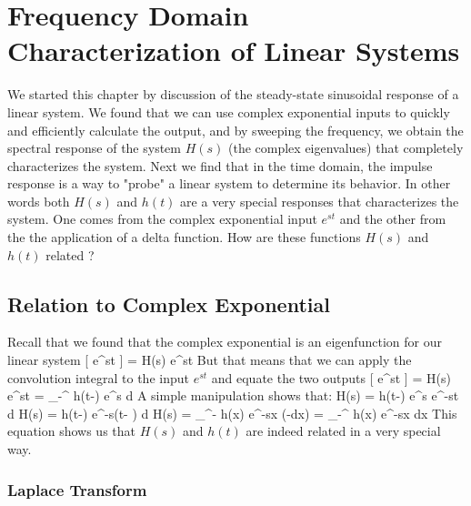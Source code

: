 
\section{Frequency Domain Characterization of Linear Systems}

We started this chapter by discussion of the steady-state sinusoidal response of a linear system.  We found that we can use complex exponential inputs to quickly and efficiently calculate the output, and by sweeping the frequency, we obtain the spectral response of the system $H(s)$ (the complex eigenvalues) that completely characterizes the system.   Next we find that in the time domain, the impulse response is a way to "probe" a linear system to determine its behavior.  In other words both $H(s)$ and $h(t)$ are a very special responses that characterizes the system.  One comes from the complex exponential input $e^{st}$ and the other from the the application of a delta function.  How are these functions $H(s)$ and $h(t)$ related ? 




\subsection{Relation to Complex Exponential}


Recall that we found that the complex exponential is an eigenfunction for our linear system 
\be
	 [ e^{st} ] = H(s) e^{st} 
\ee
But that means that we can apply the convolution integral to the input $e^{st}$ and equate the two outputs
\be
	 [ e^{st} ] = H(s) e^{st}  = \int_{-\infty}^{\infty} h(t-\tau) e^{s\tau} d\tau
\ee
A simple manipulation shows that:
\be
	H(s) = \int h(t-\tau) e^{s\tau} e^{-st} d\tau
\ee
\be
	H(s) = \int h(t-\tau) e^{-s(t- \tau)}  d\tau
\ee
\be
	H(s) = \int_{\infty}^{-\infty} h(x) e^{-sx} (-dx) = \int_{-\infty}^{\infty} h(x) e^{-sx} dx 
\ee
This equation shows us that $H(s)$ and $h(t)$ are indeed related in a very special way. 



\subsubsection{Laplace Transform}



